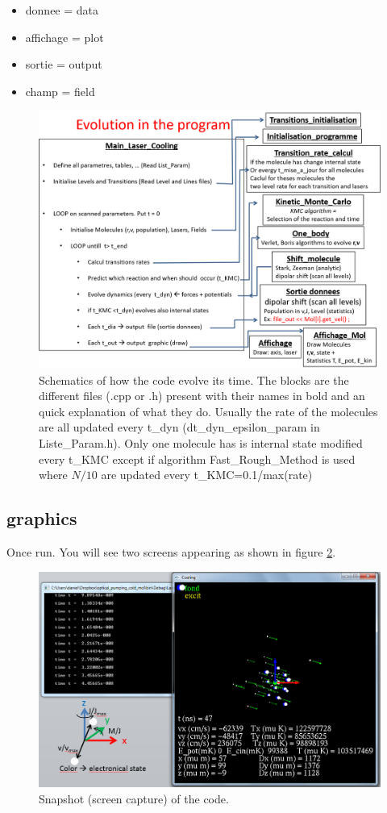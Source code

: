 \documentclass[amsmath,amssymb,nofootinbib]{revtex4-2}
\begin{document}
\begin{itemize}
	\item donnee = data
	\item affichage = plot
	\item sortie = output
	\item champ = field
 \end{itemize}


 

\begin{figure}
	\centering
	\includegraphics[width=0.7\linewidth]{evolution}
	\caption{Schematics of how the code evolve its time. The blocks are the different files (.cpp or .h) present with their names in bold and an quick explanation of what they do. Usually the rate of the molecules are all updated every t\_dyn (dt\_dyn\_epsilon\_param in Liste\_Param.h). Only one molecule has is internal state modified every t\_KMC except if algorithm Fast\_Rough\_Method is used where $N/10$ are updated every t\_KMC=0.1/max(rate)}
	\label{fig:Program_evolution}
\end{figure}





\subsection{graphics}


Once run. You will see two screens appearing as shown in figure
\ref{fig:picture}. 



\begin{figure}
	\centering
	\includegraphics[width=0.7\linewidth]{picture}
	\caption{Snapshot (screen capture) of the code.}
	\label{fig:picture}
\end{figure}
\end{document}
